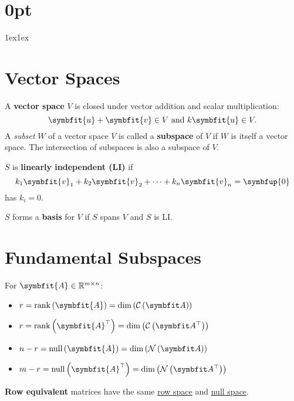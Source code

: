 \documentclass{article}
\begin{document}
\titlespacing*\section{0pt}{1ex}{1ex}
%
\setlength{\textfloatsep}{0pt}
%
\setlength{\abovedisplayskip}{1pt}
\setlength{\belowdisplayskip}{1pt}
%
\begin{minipage}[t]{62.39259259mm}
    \section*{Vector Spaces}
    A \textbf{vector space} $V$ is closed under vector addition
    and scalar multiplication:
    \begin{equation*}
        \symbfit{u}+\symbfit{v} \in V \ \text{and} \ k\symbfit{u} \in V.
    \end{equation*}
    A \textit{subset} $W$ of a vector space $V$ is called a
    \textbf{subspace} of $V$ if $W$ is itself a vector space. The
    intersection of subspaces is also a subspace of $V$.

    $S$ is \textbf{linearly independent (LI)} if
    \begin{equation*}
        k_1 \symbfit{v}_1 + k_2 \symbfit{v}_2 + \cdots + k_n \symbfit{v}_n = \symbfup{0}
    \end{equation*}
    has $k_i=0$.

    $S$ forms a \textbf{basis} for $V$ if $S$ spans $V$ and
    $S$ is LI.
    \section*{Fundamental Subspaces}
    For $\symbfit{A}\in\mathbb{R}^{m \times n}$:
    \begin{itemize}
        \item $r = \rank{\left( \symbfit{A} \right)} = \dim{\left( \columnspace{A} \right)}$
        \item $r = \rank{\left( \symbfit{A}^\top \right)} = \dim{\left( \rowspace{A} \right)}$
        \item $n - r = \vnull{\left( \symbfit{A} \right)}      = \dim{\left( \nullspace{A} \right)}$
        \item $m - r = \vnull{\left( \symbfit{A}^\top \right)} = \dim{\left( \leftnullspace{A} \right)}$
    \end{itemize}
    \textbf{Row equivalent} matrices have the same
    \underline{row space} and \underline{null space}.

\end{minipage}
\end{document}
